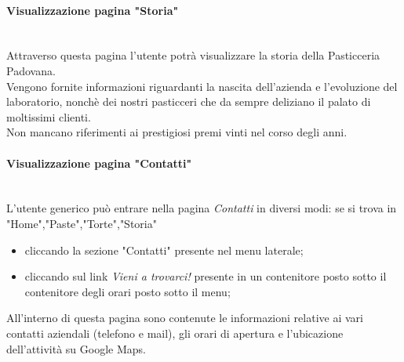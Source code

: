 \paragraph{Visualizzazione pagina "Storia"}\mbox{}\\
\label{par:VisStoria}
Attraverso questa pagina l'utente potrà visualizzare la storia della Pasticceria Padovana.\\
Vengono fornite informazioni riguardanti la nascita dell'azienda e l'evoluzione del laboratorio,
nonchè dei nostri pasticceri che da sempre deliziano il palato di moltissimi clienti.\\
Non mancano riferimenti ai prestigiosi premi vinti nel corso degli anni.

\paragraph{Visualizzazione pagina "Contatti"}\mbox{}\\
\label{par:VisContatti}
L'utente generico può entrare nella pagina \emph{Contatti} in diversi modi: se si trova in "Home","Paste","Torte","Storia"
\begin{itemize}
	\item cliccando la sezione "Contatti" presente nel menu laterale; 
	\item cliccando sul link \emph{Vieni a trovarci!} presente in un contenitore posto sotto il contenitore degli orari posto sotto il menu;
\end{itemize}
All'interno di questa pagina sono contenute le informazioni relative ai vari contatti aziendali (telefono e mail),
gli orari di apertura e l'ubicazione dell'attività su Google Maps.
